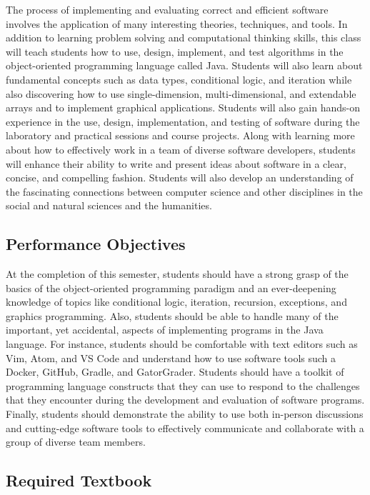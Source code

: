 \documentclass[11pt]{article}
\begin{document}
The process of implementing and evaluating correct and efficient software
involves the application of many interesting theories, techniques, and tools. In
addition to learning problem solving and computational thinking skills, this
class will teach students how to use, design, implement, and test algorithms in
the object-oriented programming language called Java. Students will also learn
about fundamental concepts such as data types, conditional logic, and iteration
while also discovering how to use single-dimension, multi-dimensional, and
extendable arrays and to implement graphical applications. Students will also
gain hands-on experience in the use, design, implementation, and testing of
software during the laboratory and practical sessions and course projects. Along
with learning more about how to effectively work in a team of diverse software
developers, students will enhance their ability to write and present ideas about
software in a clear, concise, and compelling fashion. Students will also develop
an understanding of the fascinating connections between computer science and
other disciplines in the social and natural sciences and the humanities.

\subsection*{Performance Objectives}

At the completion of this semester, students should have a strong grasp of the
basics of the object-oriented programming paradigm and an ever-deepening
knowledge of topics like conditional logic, iteration, recursion, exceptions,
and graphics programming. Also, students should be able to handle many of the
important, yet accidental, aspects of implementing programs in the Java
language. For instance, students should be comfortable with text editors such as
Vim, Atom, and VS Code and understand how to use software tools such a Docker,
GitHub, Gradle, and GatorGrader. Students should have a toolkit of programming
language constructs that they can use to respond to the challenges that they
encounter during the development and evaluation of software programs. Finally,
students should demonstrate the ability to use both in-person discussions and
cutting-edge software tools to effectively communicate and collaborate with a
group of diverse team members.

\vspace*{-.05in}

\subsection*{Required Textbook}
\end{document}
